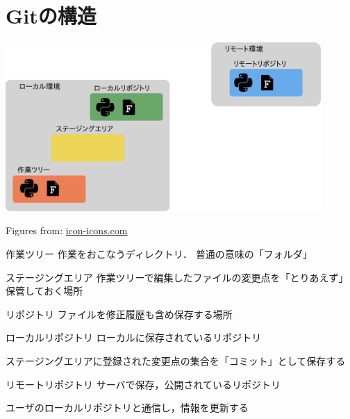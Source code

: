 \documentclass[12pt,dvipdfmx,svgnames,uplatex,aspectratio=169]{beamer}
\begin{document}
\section{Gitの構造}
\begin{frame}{\insertsection}
  \centering
  \includegraphics[bb=0.000000 0.000000 979.966736 524.329163, width=120mm]{./pics/git_structure.pdf}
  \begin{flushright}
    \scriptsize{Figures from: \href{https://icon-icons.com/ja/}{icon-icons.com}}
  \end{flushright}
\end{frame}

\begin{frame}{\insertsection}
  \begin{block}{作業ツリー}
    作業をおこなうディレクトリ．
    普通の意味の「フォルダ」
  \end{block}
  \begin{block}{ステージングエリア}
    作業ツリーで編集したファイルの変更点を「とりあえず」保管しておく場所
  \end{block}
  \begin{block}{リポジトリ}
    ファイルを修正履歴も含め保存する場所
  \end{block}
  \begin{block}{ローカルリポジトリ}
    ローカルに保存されているリポジトリ

    ステージングエリアに登録された変更点の集合を「コミット」として保存する
  \end{block}
  \begin{block}{リモートリポジトリ}
    サーバで保存，公開されているリポジトリ

    ユーザのローカルリポジトリと通信し，情報を更新する
  \end{block}
\end{frame}
\end{document}
